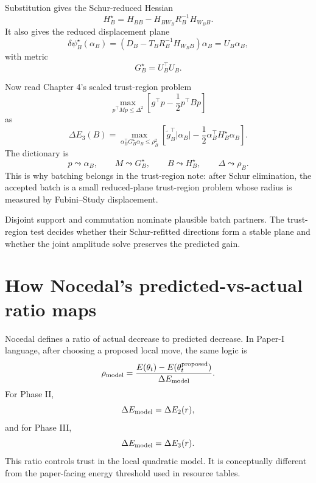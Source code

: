 \documentclass[10pt,twocolumn]{article}
\begin{document}
Substitution gives the Schur-reduced Hessian
\begin{equation}
H_B^\star
=H_{BB}-H_{BW_B}R_B^{-1}H_{W_BB}.
\label{eq:nocedal_batch_hstar}
\end{equation}
It also gives the reduced displacement plane
\begin{equation}
\delta\psi_B^\star(\alpha_B)
=
\left(D_B-T_BR_B^{-1}H_{W_BB}\right)\alpha_B
=U_B\alpha_B,
\label{eq:nocedal_batch_reduced_step}
\end{equation}
with metric
\begin{equation}
G_B^\star=U_B^\top U_B.
\label{eq:nocedal_batch_metric}
\end{equation}

Now read Chapter 4's scaled trust-region problem
\[
\max_{p^\top M p\le\Delta^2}
\left[g^\top p-\frac12p^\top Bp\right]
\]
as
\begin{equation}
\boxed{
\Delta E_3(B)
=
\max_{\alpha_B^\top G_B^\star\alpha_B\le\rho_B^2}
\left[
\widetilde g_B^\top|\alpha_B|
-\frac12\alpha_B^\top H_B^\star\alpha_B
\right].
}
\label{eq:nocedal_batch_gain}
\end{equation}
The dictionary is
\begin{equation}
p\leadsto\alpha_B,
\qquad
M\leadsto G_B^\star,
\qquad
B\leadsto H_B^\star,
\qquad
\Delta\leadsto\rho_B.
\label{eq:nocedal_batch_dictionary}
\end{equation}
This is why batching belongs in the trust-region note: after Schur elimination,
the accepted batch is a small reduced-plane trust-region problem whose radius
is measured by Fubini--Study displacement.

\begin{paperbox}
Disjoint support and commutation nominate plausible batch partners.  The
trust-region test decides whether their Schur-refitted directions form a stable
plane and whether the joint amplitude solve preserves the predicted gain.
\end{paperbox}

\section{How Nocedal's predicted-vs-actual ratio maps}

Nocedal defines a ratio of actual decrease to predicted decrease. In Paper-I language, after choosing a proposed local move, the same logic is
\begin{equation}
\rho_{\rm model}
=
\frac{
E(\theta_t)-E(\theta_t^{\rm proposed})
}{
\Delta E_{\rm model}
}.
\label{eq:model_quality_ratio_paper}
\end{equation}
For Phase II,
\begin{equation}
\Delta E_{\rm model}=\Delta E_2(r),
\label{eq:model_phase2}
\end{equation}
and for Phase III,
\begin{equation}
\Delta E_{\rm model}=\Delta E_3(r).
\label{eq:model_phase3}
\end{equation}
This ratio controls trust in the local quadratic model. It is conceptually different from the paper-facing energy threshold used in resource tables.
\end{document}
